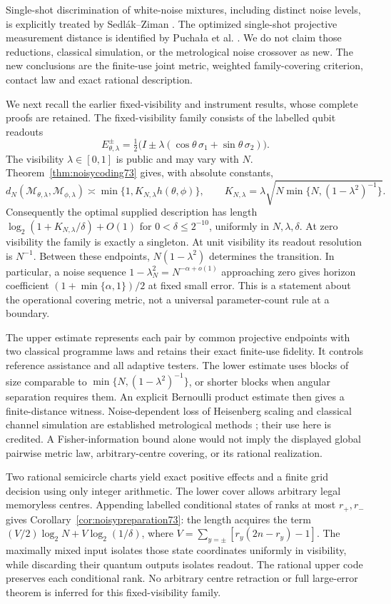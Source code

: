Single-shot discrimination of white-noise mixtures, including distinct
noise levels, is explicitly treated by Sedl\'ak--Ziman
\cite[Section VI, Example 4]{SZ74}. The optimized single-shot projective
measurement distance is identified by Pucha\l a et al.
\cite[Theorem 1]{PPKK74}. We do not claim those reductions, classical
simulation, or the metrological noise crossover as new. The new
conclusions are the finite-use joint metric, weighted family-covering
criterion, contact law and exact rational description.

We next recall the earlier fixed-visibility and instrument results,
whose complete proofs are retained. The fixed-visibility family consists of the labelled qubit readouts
\[
 E_{\theta,\lambda}^{\pm}=\tfrac12\bigl(I\pm\lambda
              (\cos\theta\,\sigma_1+\sin\theta\,\sigma_2)\bigr).
\]
The visibility $\lambda\in[0,1]$ is public and may vary with $N$.
Theorem~\ref{thm:noisycoding73} gives, with absolute constants,
\[
 d_N(\mathcal M_{\theta,\lambda},\mathcal M_{\phi,\lambda})
 \asymp \min\{1,K_{N,\lambda}h(\theta,\phi)\},\qquad
 K_{N,\lambda}=\lambda\sqrt{N\min\{N,(1-\lambda^2)^{-1}\}}.
\]
Consequently the optimal supplied description has length
$\log_2(1+K_{N,\lambda}/\delta)+O(1)$ for
$0<\delta\le2^{-10}$, uniformly in $N,\lambda,\delta$.
At zero visibility the family is exactly a singleton. At unit
visibility its readout resolution is $N^{-1}$. Between these endpoints,
$N(1-\lambda^2)$ determines the transition. In particular, a noise
sequence $1-\lambda_N^2=N^{-\alpha+o(1)}$ approaching zero gives
horizon coefficient $(1+\min\{\alpha,1\})/2$ at fixed small error.
This is a statement about the operational covering metric, not a
universal parameter-count rule at a boundary.

The upper estimate represents each pair by common projective endpoints
with two classical programme laws and retains their exact finite-use
fidelity. It controls reference assistance and all adaptive testers.
The lower estimate uses blocks of size comparable to
$\min\{N,(1-\lambda^2)^{-1}\}$, or shorter blocks when angular
separation requires them. An explicit Bernoulli product estimate then
gives a finite-distance witness. Noise-dependent loss of Heisenberg
scaling and classical channel simulation are established metrological
methods \cite{DKG67}; their use here is credited. A Fisher-information
bound alone would not imply the displayed global pairwise metric law,
arbitrary-centre covering, or its rational realization.

Two rational semicircle charts yield exact positive effects and a
finite grid decision using only integer arithmetic. The lower cover
allows arbitrary legal memoryless centres. Appending labelled
conditional states of ranks at most $r_+,r_-$ gives
Corollary~\ref{cor:noisypreparation73}: the length acquires the term
$(V/2)\log_2N+V\log_2(1/\delta)$, where
$V=\sum_{y=\pm}[r_y(2n-r_y)-1]$.
The maximally mixed input isolates those state coordinates uniformly
in visibility, while discarding their quantum outputs isolates readout.
The rational upper code preserves each conditional rank. No arbitrary
centre retraction or full large-error theorem is inferred for this
fixed-visibility family.


